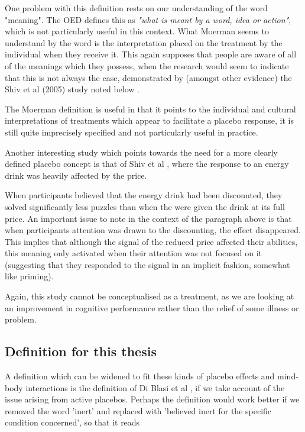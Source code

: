 One problem with this definition rests on our understanding of the word "meaning". The OED defines this as \textit{"what is meant by a word, idea or action"}, which is not particularly useful in this context. What Moerman seems to understand by the word is the interpretation placed on the treatment by the individual when they receive it. This again supposes that people are aware of all of the meanings which they possess, when the research would seem to indicate that this is not always the case, demonstrated by (amongst other evidence) the Shiv et al (2005) study noted below  \cite{Shiv2005a}.  

The Moerman definition is useful in that it points to the individual and cultural interpretations of treatments which appear to facilitate a placebo response, it is still quite imprecisely specified and not particularly useful in practice. %

Another interesting study which points towards the need for a more clearly defined placebo concept is that of Shiv et al \cite{Shiv2005a} , where the response to an energy drink was heavily affected by the price. 

When participants believed that the energy drink had been discounted, they solved significantly less puzzles than when the were given the drink at its full price. An important issue to note in the context of the paragraph above is that when participants attention was drawn to the discounting, the effect disappeared. This implies that although the signal of the reduced price affected their abilities, this meaning only activated when their attention was not focused on it (suggesting that they responded to the signal in an implicit fashion, somewhat like priming). 

Again, this study cannot be conceptualised as a treatment, as we are looking at an improvement in cognitive performance rather than the relief of some illness or problem. 

\subsection{Definition for this thesis}
\label{sec:defin-this-thes}


A definition which can be widened to fit these kinds of placebo effects and mind-body interactions is the definition of Di Blasi et al \cite{Blasi2001}, if we take account of the issue arising from active placebos. Perhaps the definition would work better if we removed the word 'inert' and replaced with 'believed inert for the specific condition concerned', so that it reads

